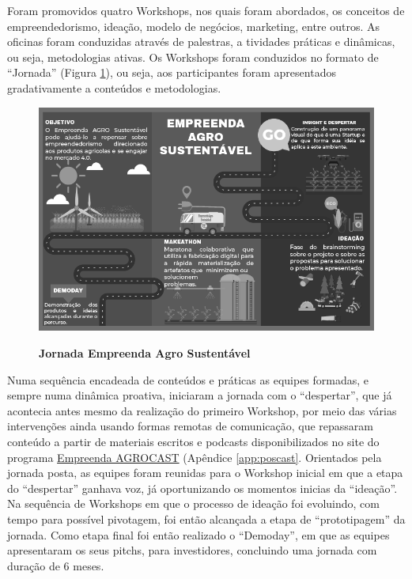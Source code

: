 Foram promovidos quatro Workshops, nos quais foram abordados, os conceitos de empreendedorismo, ideação, modelo de negócios, marketing, entre outros. As oficinas foram conduzidas através de palestras, a    tividades práticas e dinâmicas, ou seja, metodologias ativas. Os Workshops foram conduzidos no formato de “Jornada” (Figura \ref{figura_17}), ou seja, aos participantes foram apresentados gradativamente a conteúdos e metodologias. 


\begin{figure}[H]
\centering
\caption{\textbf{Jornada Empreenda Agro Sustentável}}
\includegraphics[scale=0.5]{Imagens/jornada.png}
\label{figura_17}
\end{figure}


Numa sequência encadeada de conteúdos e práticas as equipes formadas, e sempre numa dinâmica proativa, iniciaram a jornada com o “despertar”, que já acontecia antes mesmo da realização do primeiro Workshop, por meio das várias intervenções ainda usando formas remotas de comunicação, que repassaram conteúdo a partir de materiais escritos e  podcasts disponibilizados no site do programa \href{https://open.spotify.com/show/3c25hRSxvaCFPw6Y3lX3i1?si=9H_fGz_uRgGiFNhAcdr4rQ}{Empreenda AGROCAST} (Apêndice \ref{app:poscast}. Orientados pela jornada posta, as equipes foram reunidas para o Workshop inicial em que a etapa do “despertar” ganhava voz, já oportunizando os momentos inicias da “ideação”. Na sequência de Workshops em que o processo de ideação foi evoluindo, com tempo para possível pivotagem, foi então alcançada a etapa   de “prototipagem” da jornada. Como etapa final foi então realizado o “Demoday”, em que as equipes apresentaram os seus pitchs, para investidores, concluindo uma jornada com duração de 6 meses.


